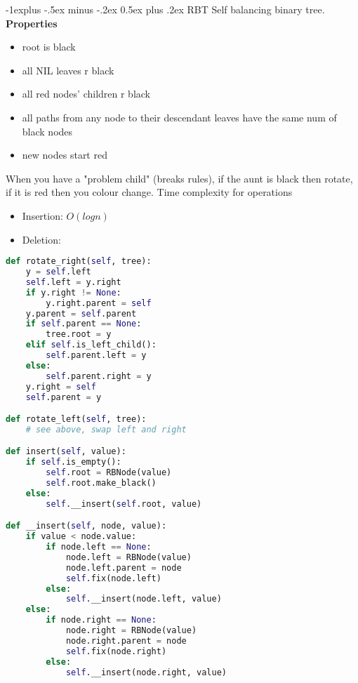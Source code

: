 \documentclass[letterpaper, 8pt]{extarticle}
\makeatletter
\renewcommand{\subsection}{\@startsection{subsection}{2}{0mm}%
                                {-1explus -.5ex minus -.2ex}%
                                {0.5ex plus .2ex}%
                                {\normalfont\small\bfseries}}
\makeatother
\begin{document}
\begin{multicols*}{5}
\subsection{RBT}
Self balancing binary tree.
\textbf{Properties}
\begin{itemize}
    \item root is black
    \item all NIL leaves r black
    \item all red nodes' children r black
    \item all paths from any node to their descendant leaves have the same num of black nodes
    \item new nodes start red
\end{itemize}
When you have a "problem child" (breaks rules), if the aunt is black then rotate, if it is red then you colour change.
Time complexity for operations
\begin{itemize}
    \item Insertion: $O(log n)$ 
    \item Deletion: %
\end{itemize}
\begin{lstlisting}[language=Python]
def rotate_right(self, tree):
    y = self.left
    self.left = y.right
    if y.right != None:
        y.right.parent = self
    y.parent = self.parent
    if self.parent == None:
        tree.root = y
    elif self.is_left_child():
        self.parent.left = y
    else:
        self.parent.right = y
    y.right = self
    self.parent = y

def rotate_left(self, tree):
    # see above, swap left and right

def insert(self, value):
    if self.is_empty():
        self.root = RBNode(value)
        self.root.make_black()
    else:
        self.__insert(self.root, value)

def __insert(self, node, value):
    if value < node.value:
        if node.left == None:
            node.left = RBNode(value)
            node.left.parent = node
            self.fix(node.left)
        else:
            self.__insert(node.left, value)
    else:
        if node.right == None:
            node.right = RBNode(value)
            node.right.parent = node
            self.fix(node.right)
        else:
            self.__insert(node.right, value)


\end{lstlisting}
\end{multicols*}
\end{document}
